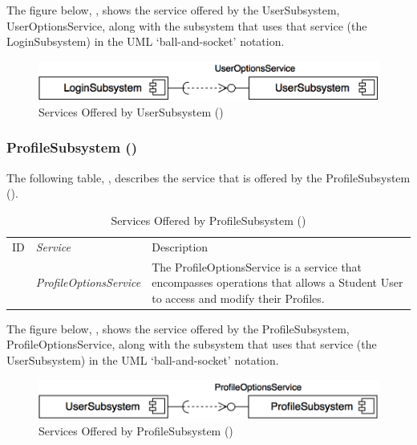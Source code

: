 \documentclass[12pt,letterpaper]{article}
\begin{document}
The figure below, , shows the service offered by the UserSubsystem, UserOptionsService, along with the subsystem that uses that service (the LoginSubsystem) in the UML `ball-and-socket' notation.

\begin{figure}[H]
	\centering{}
	\includegraphics[scale=0.40]{imgs/d3/services/user-subsystem.png}
	\caption{Services Offered by UserSubsystem ()}
\end{figure}

\subsubsection{ProfileSubsystem ()}

The following table, , describes the service that is offered by the ProfileSubsystem ().

\begin{table}[H]
	\caption{Services Offered by ProfileSubsystem ()} 
	\begin{tabu} to 
		\tableheader{}ID & Service & Description\\
		 & ProfileOptionsService & The ProfileOptionsService is a service that encompasses operations that allows a Student User to access and modify their Profiles.\\
	\end{tabu}
\end{table}

The figure below, , shows the service offered by the ProfileSubsystem, ProfileOptionsService, along with the subsystem that uses that service (the UserSubsystem) in the UML `ball-and-socket' notation.

\begin{figure}[H]
	\centering{}
	\includegraphics[scale=0.40]{imgs/d3/services/profile-subsystem.png}
	\caption{Services Offered by ProfileSubsystem ()}
\end{figure}
\end{document}
